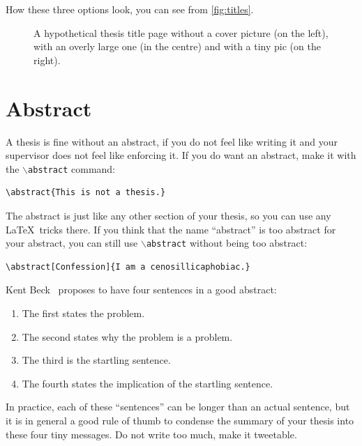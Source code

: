 \documentclass{uvamscse}
\newcommand{\cmd}[1]{\texttt{$\backslash$#1}}
\begin{document}
How these three options look, you can see from \autoref{fig:titles}.

\begin{figure}[t]
  \hfill
  \hfill
  \caption{A hypothetical thesis title page without a cover picture (on the left), with an overly large one (in the centre) and with a tiny pic (on the right).}
  \label{fig:titles}
\end{figure}

\section{Abstract}

A thesis is fine without an abstract, if you do not feel like writing it and
your supervisor does not feel like enforcing it. If you do want an abstract,
make it with the \cmd{abstract} command:

\begin{snippet}
\begin{verbatim}
\abstract{This is not a thesis.}
\end{verbatim}
\end{snippet}

The abstract is just like any other section of your thesis, so you can use any
\LaTeX\ tricks there. If you think that the name ``abstract'' is too abstract
for your abstract, you can still use \cmd{abstract} without being too
abstract:

\begin{snippet}
\begin{verbatim}
\abstract[Confession]{I am a cenosillicaphobiac.}
\end{verbatim}
\end{snippet}

Kent Beck~\cite{JohnsonBBCGW93} proposes to have four sentences in a good abstract:

\begin{enumerate}
  \item The first states the problem.
  \item The second states why the problem is a problem.
  \item The third is the startling sentence.
  \item The fourth states the implication of the startling sentence.
\end{enumerate}

In practice, each of these ``sentences'' can be longer than an actual
sentence, but it is in general a good rule of thumb to condense the summary of
your thesis into these four tiny messages. Do not write too much, make it
tweetable.
\end{document}

